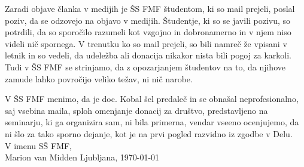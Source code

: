 \documentclass[a4paper,oneside,12pt]{article}
\theoremstyle{definition}
\begin{document}
Zaradi objave članka v medijih je ŠS FMF študentom, ki so mail prejeli, poslal poziv, da se odzovejo na objavo v
medijih. Študentje, ki so se javili pozivu, so potrdili, da so sporočilo razumeli kot vzgojno in dobronamerno in v njem niso videli nič spornega. V trenutku ko so mail prejeli, so bili namreč že vpisani v letnik in so vedeli, da udeležba ali donacija nikakor nista bili pogoj za karkoli. Tudi v ŠS FMF se strinjamo, da z opozarjanjem študentov na to, da njihove zamude lahko povročijo veliko težav, ni nič narobe.

V ŠS FMF menimo, da je doc. Kobal šel predaleč in se obnašal neprofesionalno, saj vsebina maila, sploh omenjanje donacij za društvo, predstavljeno na seminarju, ki ga organizira sam, ni bila primerna, vendar vseeno ocenjujemo, da ni šlo za tako sporno dejanje, kot je na prvi pogled razvidno iz zgodbe v Delu. \\

\noindent V imenu SŠ FMF, \\
Marion van Midden \hfill Ljubljana, \today

\end{document}
